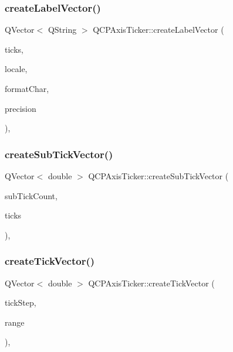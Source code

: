 \subsubsection{\texorpdfstring{create\+Label\+Vector()}{createLabelVector()}}
{\footnotesize\ttfamily Q\+Vector$<$ Q\+String $>$ Q\+C\+P\+Axis\+Ticker\+::create\+Label\+Vector (\begin{DoxyParamCaption}\item[{const Q\+Vector$<$ double $>$ \&}]{ticks,  }\item[{const Q\+Locale \&}]{locale,  }\item[{Q\+Char}]{format\+Char,  }\item[{int}]{precision }\end{DoxyParamCaption})\hspace{0.3cm}{\ttfamily [protected]}, {\ttfamily [virtual]}}

\mbox{\label{class_q_c_p_axis_ticker_a9a6435723fa0bd366d1ea4c2cff7c33f}} 
\subsubsection{\texorpdfstring{create\+Sub\+Tick\+Vector()}{createSubTickVector()}}
{\footnotesize\ttfamily Q\+Vector$<$ double $>$ Q\+C\+P\+Axis\+Ticker\+::create\+Sub\+Tick\+Vector (\begin{DoxyParamCaption}\item[{int}]{sub\+Tick\+Count,  }\item[{const Q\+Vector$<$ double $>$ \&}]{ticks }\end{DoxyParamCaption})\hspace{0.3cm}{\ttfamily [protected]}, {\ttfamily [virtual]}}

\mbox{\label{class_q_c_p_axis_ticker_af4645a824c7bd2ca8fc7e86ebf9055bd}} 
\subsubsection{\texorpdfstring{create\+Tick\+Vector()}{createTickVector()}}
{\footnotesize\ttfamily Q\+Vector$<$ double $>$ Q\+C\+P\+Axis\+Ticker\+::create\+Tick\+Vector (\begin{DoxyParamCaption}\item[{double}]{tick\+Step,  }\item[{const \hyperlink{class_q_c_p_range}{Q\+C\+P\+Range} \&}]{range }\end{DoxyParamCaption})\hspace{0.3cm}{\ttfamily [protected]}, {\ttfamily [virtual]}}



